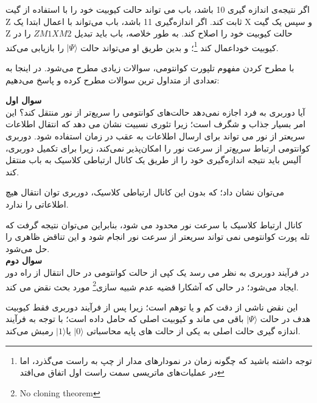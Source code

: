\documentclass{book}
\begin{document}
اگر نتیجه‌ی اندازه گیری 10 باشد، باب می تواند حالت کیوبیت خود را با استفاده از گیت Z ثابت کند. اگر اندازه‌گیری 11 باشد، باب می‌تواند با اعمال ابتدا یک X و سپس یک گیت Z حالت کیوبیت خود را اصلاح کند. به طور خلاصه، باب باید تبدیل $  ZM1 XM2$ را در کیوبیت خوداعمال کند \footnote{توجه داشته باشید که چگونه زمان در نمودارهای مدار از چپ به راست می‌گذرد، اما در عملیات‌های ماتریسی سمت راست اول اتفاق می‌افتد}؛ و بدین طریق او می‌تواند حالت $\vert \Psi \rangle$ را بازیابی می‌کند. 

با مطرح کردن مفهوم تلپورت کوانتومی، سوالات زیادی مطرح می‌شود. در اینجا به تعدادی از متداول ترین سوالات مطرح کرده و پاسخ می‌دهیم:

\textbf{سوال اول} \\
آیا دوربری به فرد اجازه نمی‌دهد حالت‌های کوانتومی را سریع‌تر از نور منتقل کند؟ این امر بسیار جذاب و شگرف است؛ زیرا تئوری نسبیت نشان می دهد که انتقال اطلاعات سریعتر از نور می تواند برای ارسال اطلاعات به عقب در زمان استفاده شود. دوربری کوانتومی ارتباط سریع‌تر از سرعت نور را امکان‌پذیر نمی‌کند، زیرا برای تکمیل دوربری، آلیس باید نتیجه اندازه‌گیری خود را از طریق یک کانال ارتباطی کلاسیک به باب منتقل کند.

می‌توان نشان داد؛ که بدون این کانال ارتباطی کلاسیک، دوربری توان انتقال هیچ اطلاعاتی را ندارد.

کانال ارتباط کلاسیک با سرعت نور محدود می شود، بنابراین می‌توان نتیجه گرفت که تله پورت کوانتومی نمی تواند سریعتر از سرعت نور انجام شود و این تناقض ظاهری را حل می‌شود. \\


\textbf{سوال دوم}\\
در فرآیند دوربری به نظر می رسد یک کپی از حالت کوانتومی در حال انتقال از راه دور ایجاد می‌شود؛ در حالی که آشکارا قضیه عدم شبیه سازی\footnote{No cloning theorem} مورد بحث نقض می کند.

این نقض ناشی از دقت کم و یا توهم است؛ زیرا پس از فرآیند دوربری فقط کیوبیت هدف در حالت $\vert \Psi \rangle$ باقی می ماند و کیوبیت اصلی که حامل داده است؛ با توجه به فرآیند اندازه گیری حالت اصلی به یکی از حالت های پایه محاسباتی $\vert 0 \rangle$ یا$\vert 1 \rangle$ رمبش می‌کند.

\newpage
	
	
	
\end{document}
